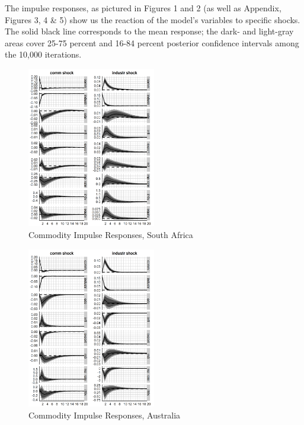\documentclass[12pt,]{article}
\begin{document}
The impulse responses, as pictured in Figures 1 and 2 (as well as
Appendix, Figures 3, 4 \& 5) show us the reaction of the model's
variables to specific shocks. The solid black line corresponds to the
mean response; the dark- and light-gray areas cover 25-75 percent and
16-84 percent posterior confidence intervals among the 10,000
iterations.

\begin{figure}
\centering
\includegraphics[width=0.50000\textwidth]{img/irf_short_ZAF.png}
\caption{Commodity Impulse Responses, South Africa}
\end{figure}

\begin{figure}
\centering
\includegraphics[width=0.50000\textwidth]{img/irf_short_AUS.png}
\caption{Commodity Impulse Responses, Australia}
\end{figure}
\end{document}
